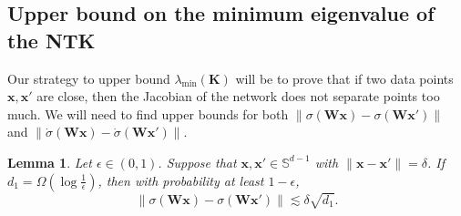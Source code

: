 \documentclass{article}
\newtheorem{lemma}[theorem]{Lemma}
\theoremstyle{definition}
\renewcommand{\S}{\mathbb{S}}
\def\vx{{\bm{x}}}
\def\mK{{\bm{K}}}
\def\mW{{\bm{W}}}
\begin{document}
\subsection{Upper bound on the minimum eigenvalue of the NTK}
\label{app:upper-bound-min-eigenvalue}
Our strategy to upper bound $\lambda_{\min}(\mK)$ will be to prove that if two data points $\vx, \vx'$ are close, then the Jacobian of the network does not separate points too much. We will need to find upper bounds for both $\|\sigma(\mW \vx) - \sigma(\mW \vx')\|$ and $\|\dot{\sigma}(\mW \vx) - \dot{\sigma}(\mW \vx')\|$.  
\begin{lemma}\label{lemma:feature-map-regularity}
    Let $\epsilon \in (0, 1)$. Suppose that $\vx, \vx' \in \S^{d - 1}$ with $\|\vx - \vx'\| = \delta$. If $d_1 = \Omega\left(\log \frac{1}{\epsilon}\right)$, then with probability at least $1 - \epsilon$,
    \[\|\sigma(\mW\vx) - \sigma(\mW\vx')\| \lesssim \delta \sqrt{d_1}. \]
\end{lemma}
\end{document}
